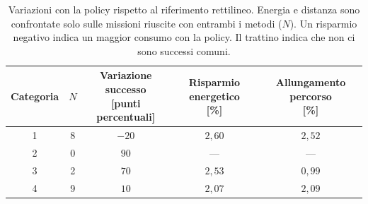 \begin{table}[H]
\centering
\caption{Variazioni con la policy rispetto al riferimento rettilineo. Energia e distanza sono confrontate solo sulle missioni riuscite con entrambi i metodi ($N$). Un risparmio negativo indica un maggior consumo con la policy. Il trattino indica che non ci sono successi comuni.}
\label{tab:big-map-12m-confronto-variazioni}
\small
\setlength{\tabcolsep}{4pt}
\begin{tabular}{@{}ccccc@{}}
\toprule
Categoria & $N$ & \shortstack{Variazione successo\\{}[punti percentuali]} & \shortstack{Risparmio energetico\\{}[\%]} & \shortstack{Allungamento percorso\\{}[\%]} \\
\midrule
1 & 8 & $-20$ & $2{,}60$ & $2{,}52$ \\
2 & 0 & $90$ & --- & --- \\
3 & 2 & $70$ & $2{,}53$ & $0{,}99$ \\
4 & 9 & $10$ & $2{,}07$ & $2{,}09$ \\
\bottomrule
\end{tabular}
\end{table}
